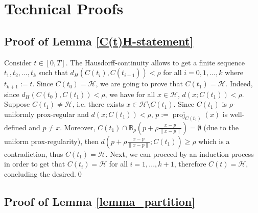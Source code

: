 \documentclass[preprint,12pt]{elsarticle}
\renewcommand{\H}{\mathcal{H}}
\DeclareMathOperator{\proj}{proj}
\theoremstyle{plain}
\theoremstyle{definition}
\theoremstyle{remark}
\begin{document}
    
    {\small
	
    
    }
 \appendix
 \begingroup
 \small
 \setlength{\baselineskip}{0.9\baselineskip}
 
 \section{Technical Proofs}
\subsection{Proof of Lemma \ref{C(t)H-statement}}\label{C(t)=H.proof}
\noindent Consider $t\in [0,T]$. The Hausdorff-continuity allows to get a finite sequence $t_1,t_2,...,t_k$ such that $d_H(C(t_i),C(t_{i+1}))<\rho$ for all $i=0,1,...,k$ where $t_{k+1} := t$. Since $C(t_0) = \H$, we are going to prove that $C(t_1) = \H$. Indeed, since $d_H(C(t_0),C(t_1))<\rho$, we have for all $x\in \H$, $d(x;C(t_1))<\rho$. Suppose $C(t_1)\neq \H$, i.e. there exists $x\in \H\setminus C(t_1)$. Since $C(t_1)$ is $\rho$-uniformly prox-regular and $d(x;C(t_1))<\rho$, $p:=\proj_{C(t_1)}(x)$ is well-defined and $p\neq x$. Moreover, $C(t_1)\cap \mathbb{B}_{\rho}(p+\rho\frac{x-p}{\|x-p\|}) = \emptyset$ (due to the uniform prox-regularity), then $d\left(p+\rho\frac{x-p}{\|x-p\|};C(t_1)\right)\geq \rho$ which is a contradiction, thus $C(t_1) = \H$. Next, we can proceed by an induction process in order to get that $C(t_i) = \H$ for all $i=1,...,k+1$, therefore $C(t) = \H$, concluding the desired.\qed

 
\subsection{Proof of Lemma \ref{lemma_partition}}\label{appendix1}
\end{document}
